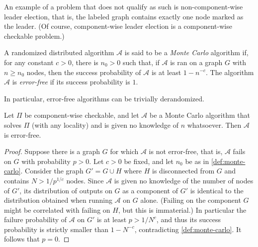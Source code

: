 \documentclass[11pt]{article}
\begin{document}
An example of a problem that does not qualify as such is non-component-wise
leader election, that is, the labeled graph contains exactly one node marked as
the leader.
(Of course, component-wise leader election is a component-wise checkable
problem.)

\begin{definition}\label{def:monte-carlo}
	A randomized distributed algorithm $\mathcal{A}$ is said to be a \emph{Monte
	Carlo} algorithm if, for any constant $c > 0$, there is $n_0 > 0$ such that,
	if $\mathcal{A}$ is ran on a graph $G$ with $n \ge n_0$ nodes, then the
	success probability of $\mathcal{A}$ is at least $1 - n^{-c}$.
	The algorithm $\mathcal{A}$ is \emph{error-free} if its success probability is
	$1$.
\end{definition}

In particular, error-free algorithms can be trivially derandomized.

\begin{theorem}
	Let $\Pi$ be component-wise checkable, and let $\mathcal{A}$ be a Monte Carlo
	algorithm that solves $\Pi$ (with any locality) and is given no knowledge of
	$n$ whatsoever.
	Then $\mathcal{A}$ is error-free.
\end{theorem}

\begin{proof}
	Suppose there is a graph $G$ for which $\mathcal{A}$ is not error-free, that
	is, $\mathcal{A}$ fails on $G$ with probability $p > 0$.
	Let $c > 0$ be fixed, and let $n_0$ be as in \cref{def:monte-carlo}.
	Consider the graph $G' = G \cup H$ where $H$ is disconnected from $G$ and
	contains $N > 1/p^{1/c}$ nodes.
	Since $\mathcal{A}$ is given no knowledge of the number of nodes of $G'$, its
	distribution of outputs on $G$ as a component of $G'$ is identical to the
	distribution obtained when running $\mathcal{A}$ on $G$ alone.
	(Failing on the component $G$ might be correlated with failing on $H$, but
	this is immaterial.)
	In particular the failure probability of $\mathcal{A}$ on $G'$ is at least $p
	> 1/N^c$, and thus its success probability is strictly smaller than $1 -
	N^{-c}$, contradicting \cref{def:monte-carlo}.
	It follows that $p = 0$.
\end{proof}
\end{document}
